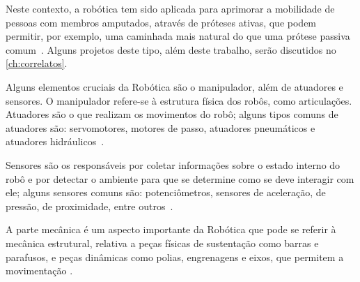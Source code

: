 Neste contexto, a robótica tem sido aplicada para aprimorar a mobilidade de pessoas com membros amputados, através de próteses ativas, que podem permitir, por exemplo, uma caminhada mais natural do que uma prótese passiva comum~\cite{dedic:2011}. Alguns projetos deste tipo, além deste trabalho, serão discutidos no \autoref{ch:correlatos}.

Alguns elementos cruciais da Robótica são o manipulador, além de atuadores e sensores. O manipulador refere-se à estrutura física dos robôs, como articulações. Atuadores são o que realizam os movimentos do robô; alguns tipos comuns de atuadores são: servomotores, motores de passo, atuadores pneumáticos e atuadores hidráulicos~\cite{niku:2010robotics_intro}.

Sensores são os responsáveis por coletar informações sobre o estado interno do robô e por detectar o ambiente para que se determine como se deve interagir com ele; alguns sensores comuns são: potenciômetros, sensores de aceleração, de pressão, de proximidade, entre outros~\cite{niku:2010robotics_intro}.

A parte mecânica é um aspecto importante da Robótica que pode se referir à mecânica estrutural, relativa a peças físicas de sustentação como barras e parafusos, e peças dinâmicas como polias, engrenagens e eixos, que permitem a movimentação \cite{modelix:2010guia_robotica}.





